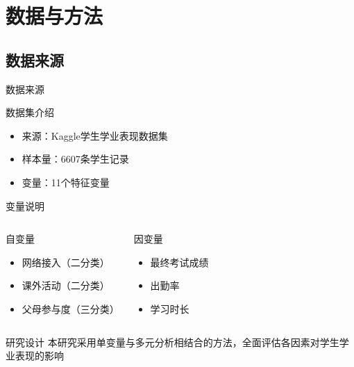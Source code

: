 \documentclass{beamer}
\begin{document}

\section{数据与方法}

\subsection{数据来源}
\begin{frame}{数据来源}
    \begin{block}{数据集介绍}
        \begin{itemize}
            \item 来源：Kaggle学生学业表现数据集
            \item 样本量：6607条学生记录
            \item 变量：11个特征变量
        \end{itemize}
    \end{block}

    \vspace{0.5cm}

    \begin{block}{变量说明}
        \begin{columns}
            \begin{block}{自变量}
                \begin{itemize}
                    \item 网络接入（二分类）
                    \item 课外活动（二分类）
                    \item 父母参与度（三分类）
                \end{itemize}
            \end{block}
            
            \begin{block}{因变量}
                \begin{itemize}
                    \item 最终考试成绩
                    \item 出勤率
                    \item 学习时长
                \end{itemize}
            \end{block}
        \end{columns}
    \end{block}

    \vspace{0.5cm}

    \begin{alertblock}{研究设计}
        本研究采用单变量与多元分析相结合的方法，全面评估各因素对学生学业表现的影响
    \end{alertblock}
\end{frame}
\end{document}
